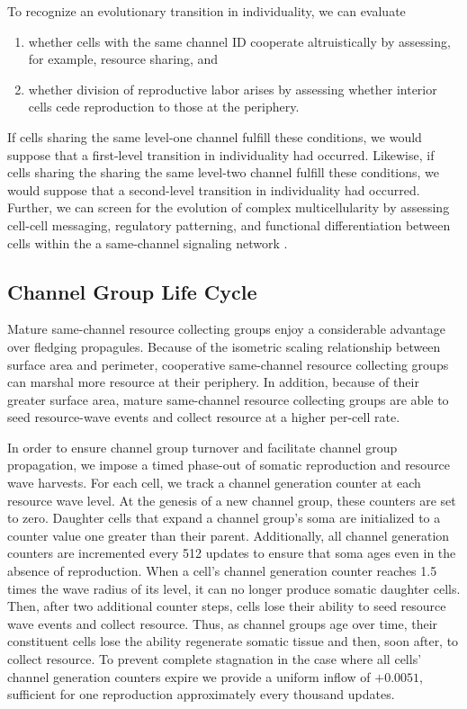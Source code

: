 To recognize an evolutionary transition in individuality, we can evaluate
\begin{enumerate}
\item whether cells with the same channel ID cooperate altruistically by assessing, for example, resource sharing, and
\item whether division of reproductive labor arises by assessing whether interior cells cede reproduction to those at the periphery.
\end{enumerate}
If cells sharing the same level-one channel fulfill these conditions, we would suppose that a first-level transition in individuality had occurred.
Likewise, if cells sharing the sharing the same level-two channel fulfill these conditions, we would suppose that a second-level transition in individuality had occurred.
Further, we can screen for the evolution of complex multicellularity by assessing cell-cell messaging, regulatory patterning, and functional differentiation between cells within the a same-channel signaling network \cite{knoll2011multiple}.

\subsection{Channel Group Life Cycle} \label{sup:channel_group_life_cycle}

Mature same-channel resource collecting groups enjoy a considerable advantage over fledging propagules.
Because of the isometric scaling relationship between surface area and perimeter, cooperative same-channel resource collecting groups can marshal more resource at their periphery.
In addition, because of their greater surface area, mature same-channel resource collecting groups are able to seed resource-wave events and collect resource at a higher per-cell rate.

In order to ensure channel group turnover and facilitate channel group propagation, we impose a timed phase-out of somatic reproduction and resource wave harvests.
For each cell, we track a channel generation counter at each resource wave level.
At the genesis of a new channel group, these counters are set to zero.
Daughter cells that expand a channel group's soma are initialized to a counter value one greater than their parent.
Additionally, all channel generation counters are incremented every 512 updates to ensure that soma ages even in the absence of reproduction.
When a cell's channel generation counter reaches 1.5 times the wave radius of its level, it can no longer produce somatic daughter cells.
Then, after two additional counter steps, cells lose their ability to seed resource wave events and collect resource.
Thus, as channel groups age over time, their constituent cells lose the ability regenerate somatic tissue and then, soon after, to collect resource.
To prevent complete stagnation in the case where all cells' channel generation counters expire we provide a uniform inflow of $+0.0051$, sufficient for one reproduction approximately every thousand updates.


